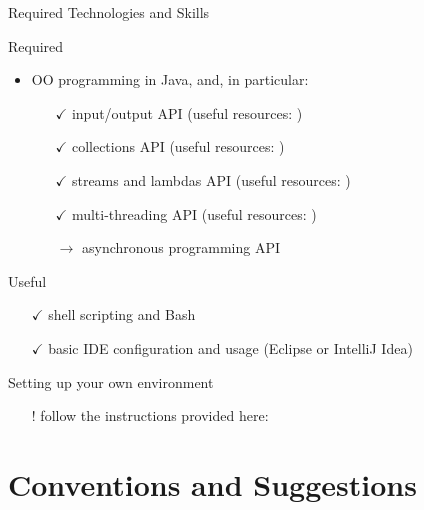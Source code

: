 \documentclass[presentation]{beamer}\mode<presentation>{\usetheme{AMSBolognaFC}}
\begin{document}
\begin{frame}[c,allowframebreaks]{Required Technologies and Skills}
\begin{alertblock}{Required}
\begin{itemize}
            \item OO programming in Java, and, in particular:
            \begin{itemize}
                \item[$\checkmark$] input/output API (useful resources: \cite{ProgrammizJavaIO})
                \item[$\checkmark$] collections API (useful resources: \cite{Naftalin2006, Bloch2008, JavaCollectionsCheatsheets})
                \item[$\checkmark$] streams and lambdas API (useful resources: \cite{Warburton2014, Bloch2008})
                \item[$\checkmark$] multi-threading API (useful resources: \cite{Lea1999, Oaks2004, Garg2004, Goetz2006})
                \item[$\rightarrow$] asynchronous programming API
            \end{itemize}

        \end{itemize}
    \end{alertblock}

    \begin{exampleblock}{Useful}
        \begin{itemize}
            \item[$\checkmark$] shell scripting and \alert{Bash}
            \item[$\checkmark$] basic IDE configuration and usage (\alert{Eclipse} or \alert{IntelliJ Idea})
        \end{itemize}
    \end{exampleblock}

    \begin{alertblock}{Setting up your own environment}
        \begin{itemize}
            \item[!] follow the instructions provided here: \cite{envSetup}
        \end{itemize}
    \end{alertblock}

\end{frame}

\section{Conventions and Suggestions}
\end{document}
